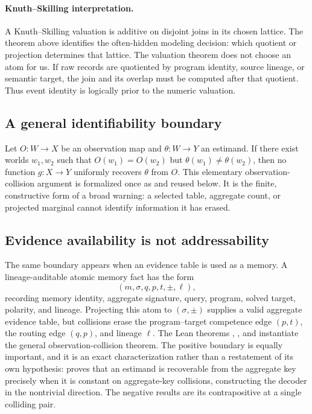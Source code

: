 \documentclass[11pt,openany]{report}
\begin{document}
\paragraph{Knuth--Skilling interpretation.}
A Knuth--Skilling valuation is additive on disjoint joins in its chosen
lattice.  The theorem above identifies the often-hidden modeling decision:
which quotient or projection determines that lattice.  The valuation theorem
does not choose an atom for us.  If raw records are quotiented by program
identity, source lineage, or semantic target, the join and its overlap must be
computed after that quotient.  Thus event identity is logically prior to the
numeric valuation.

\subsection{A general identifiability boundary}

Let $O:W\to X$ be an observation map and $\theta:W\to Y$ an estimand.  If
there exist worlds $w_1,w_2$ such that
$O(w_1)=O(w_2)$ but $\theta(w_1)\ne\theta(w_2)$, then no function
$g:X\to Y$ uniformly recovers $\theta$ from $O$.  This elementary
observation-collision argument is formalized once as
 and reused below.
It is the finite, constructive form of a broad warning: a selected table,
aggregate count, or projected marginal cannot identify information it has
erased.

\subsection{Evidence availability is not addressability}

The same boundary appears when an evidence table is used as a memory.  A
lineage-auditable atomic memory fact has the form
\[
  (m,\sigma,q,p,t,\pm,\ell),
\]
recording memory identity, aggregate signature, query, program, solved target,
polarity, and lineage.  Projecting this atom to $(\sigma,\pm)$ supplies a valid
aggregate evidence table, but collisions erase the program--target competence
edge $(p,t)$, the routing edge $(q,p)$, and lineage $\ell$.  The Lean theorems
,
, and
 instantiate the general
observation-collision theorem.  The positive boundary is equally important, and
it is an exact characterization rather than a restatement of its own
hypothesis:  proves that an
estimand is recoverable from the aggregate key precisely when it is constant on
aggregate-key collisions, constructing the decoder in the nontrivial direction.
The negative results are its contrapositive at a single colliding pair.
\end{document}
